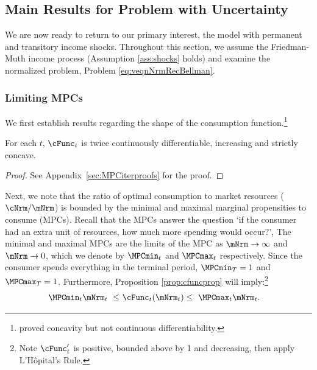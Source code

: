 \documentclass[BufferStockTheory]{subfiles}
\begin{document}
\hypertarget{limsolexists}{}
\subsection{Main Results for Problem with Uncertainty}\label{subsec:limSolExists}

We are now ready to return to our primary interest, the model with permanent and transitory income shocks.
Throughout this section, we assume the Friedman-Muth income process (Assumption \ref{ass:shocks} holds) and examine the normalized problem, Problem \ref{eq:veqnNrmRecBellman}.



\subsubsection{Limiting MPCs}\label{subsubsec:cFuncBounds}

We first establish results regarding the shape of the consumption function.\footnote{\cite{ckConcavity} proved concavity but not continuous differentiability.}

\begin{proposition} \label{prop:cfuncprop} For each $t$, $\cFunc_{t}$ is twice continuously differentiable, increasing and strictly concave.
\end{proposition}
\begin{proof}\let\qed\relax
See Appendix~\ref{sec:MPCiterproofs} for the proof.

\end{proof}

Next, we note that the ratio of optimal consumption to market resources ($\cNrm/\mNrm$) is bounded by the minimal and maximal marginal propensities to consume (MPCs).
Recall that the MPCs answer the question `if the consumer had an extra unit of resources, how much more spending would occur?', The minimal and maximal MPCs are the limits of the MPC as $\mNrm \rightarrow \infty$ and $\mNrm \rightarrow 0$, which we denote by $\MPCmin_{t}$ and $\MPCmax_{t}$ respectively.
Since the consumer spends everything in the terminal period, $\MPCmin_{T}=1$ and $\MPCmax_{T}=1$.
Furthermore, Proposition \ref{prop:cfuncprop} will imply:\footnote{Note $\usual{\cFunc}_{t}^{\prime}$ is positive, bounded above by 1 and decreasing, then apply L'H\^{o}pital's Rule.}
%
\begin{equation}\begin{gathered}\begin{aligned}\label{eq:cBounds}
  \MPCmin_{t} \mNrm_{t} ~ \leq & ~  \usual{\cFunc}_{t}(\mNrm_{t})  \leq  ~ \MPCmax_{t} \mNrm_{t} .
\end{aligned}\end{gathered}\end{equation} 
\end{document}
